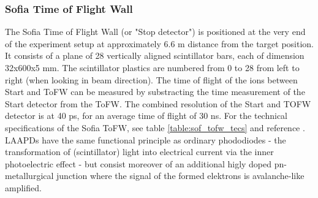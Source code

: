 \subsubsection{Sofia Time of Flight Wall}
The Sofia Time of Flight Wall (or "Stop detector") is positioned at the very end of the experiment setup at approximately 6.6 m distance from the target position. It consists of a plane of 28 vertically aligned scintillator bars, each of dimension 32x600x5 mm. The scintillator plastics are numbered from 0 to 28 from left to right (when looking in beam direction). The time of flight of the ions between Start and ToFW can be measured by substracting the time measurement of  the Start detector from the ToFW. The combined resolution of the Start and TOFW detector is at 40 ps, for an average time of flight of 30 ns\cite{martin2021fission}. For the technical specifications of the Sofia ToFW, see table \ref{table:sof_tofw_tecs} and reference \cite{bail2011time}. LAAPDs have the same functional principle as ordinary phododiodes - the transformation of (scintillator) light into electrical current via the inner photoelectric effect - but consist moreover of an additional higly doped pn-metallurgical junction where the signal of the formed elektrons is avalanche-like amplified.
\begin{figure}
\begin{floatrow}
\end{floatrow}
\end{figure}

